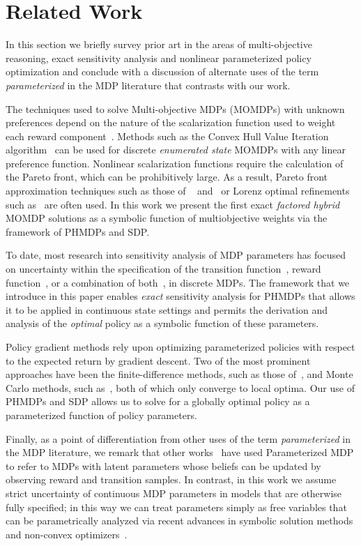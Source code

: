 \section{Related Work}
\label{sec:background}

In this section we briefly survey prior art in the areas of multi-objective reasoning, exact sensitivity analysis and nonlinear parameterized policy optimization and conclude with a discussion of alternate uses of the term \emph{parameterized} in the MDP literature that contrasts with our work.

The techniques used to solve Multi-objective MDPs (MOMDPs) with unknown preferences depend on the nature of the scalarization function used to weight each reward component~\cite{Roijers_JAIR_2013}. Methods such as the Convex Hull Value Iteration algorithm~\cite{Barrett_ICML_2008} can be used for discrete \emph{enumerated state} MOMDPs with any linear preference function. Nonlinear scalarization functions require the calculation of the Pareto front, which can be prohibitively large. As a result, Pareto front approximation techniques such as those of ~\cite{Chatterjee_STACS_2006} and~\cite{Pirotta_AAAI_2015} or Lorenz optimal refinements such as~\cite{Perny_AAAI_2013} are often used. In this work we present the first exact \emph{factored hybrid} MOMDP solutions as a symbolic function of multiobjective weights via the framework of PHMDPs and SDP.

To date, most research into sensitivity analysis of MDP parameters has focused on uncertainty within the specification of the transition function~\cite{Kalyanasundaram_AJC_2004}, reward function~\cite{Tan_JAP_2011}, or a combination of both~\cite{Givan_AI_2000}, in discrete MDPs. The framework that we introduce in this paper enables \textit{exact} sensitivity analysis for PHMDPs that allows it to be applied in continuous state settings and permits the derivation and analysis of the \emph{optimal} policy as a symbolic function of these parameters.

Policy gradient methods rely upon optimizing parameterized policies with respect to the expected return by gradient descent. 
Two of the most prominent approaches have been the finite-difference methods, such as those of~\cite{Ng_UAI_2000}, and Monte Carlo methods, such as~\cite{Sutton_NIPS_1999,Baxter_ISCAS_2000}, both of which only converge to local optima.
Our use of PHMDPs and SDP allows us to solve for a globally optimal policy as a parameterized function of policy parameters.

Finally, as a point of differentiation from other uses of the term \emph{parameterized} in the MDP literature, we remark that other works~\cite{Doshi-VelezK16,Duff_UMA_2002,Dearden_UAI_1999,Gopalan_COLT_2015} have used Parameterized MDP to refer to MDPs with latent parameters whose beliefs can be updated by observing reward and transition samples. In contrast, in this work we assume strict uncertainty of continuous MDP parameters in models that are otherwise fully specified; in this way we can treat parameters simply as free variables that can be parametrically analyzed via recent advances in symbolic solution methods and non-convex optimizers~\cite{Gao2013}.


